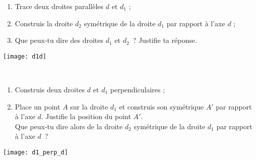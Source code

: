 
\begin{activite}

\begin{minipage}[c]{0.62\linewidth}
\begin{partie}
\begin{enumerate}
 \item Trace deux droites parallèles \textcolor{B2}{$d$} et $d_1$ ;
 \item Construis la droite $d_2$ symétrique de la droite $d_1$ par rapport à l'axe \textcolor{B2}{$d$} ;
 \item Que peux‑tu dire des droites $d_1$ et $d_2$ ? Justifie ta réponse.
 \end{enumerate}
\end{partie}
 \end{minipage}
   \qquad \begin{minipage}[c]{0.36\linewidth}
  \texttt{[image: d1d]}
  \end{minipage} \\

\vspace{1em}

\begin{minipage}[c]{0.62\linewidth}
\begin{partie}
\begin{enumerate}
 \item Construis deux droites \textcolor{B2}{$d$} et $d_1$ perpendiculaires ;
 \item Place un point $A$ sur la droite $d_1$ et construis son symétrique $A'$ par rapport à l'axe \textcolor{B2}{$d$}. Justifie la position du point $A'$. \\[0.5em]
Que peux-tu dire alors de la droite $d_2$ symétrique de la droite $d_1$ par rapport à l'axe $d$ ?
 \end{enumerate}
\end{partie}
 \end{minipage}
   \qquad \begin{minipage}[c]{0.36\linewidth}
  \texttt{[image: d1\_perp\_d]}
  \end{minipage} \\

\end{activite}


